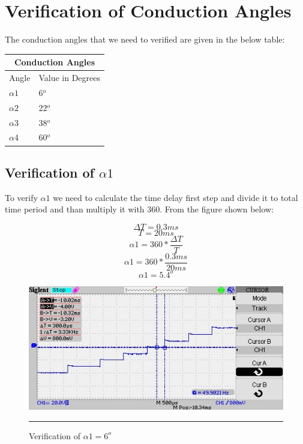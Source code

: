 \section{Verification of Conduction Angles}
The conduction angles that we need to verified are given in the below table:
\begin{center}
	\begin{tabular}{ |p{4cm}||p{4cm}|  }
		\hline
		\multicolumn{2}{|c|}{Conduction Angles} \\
		\hline
		Angle & Value in Degrees\\
		\hline
		$\alpha1$ & 6$^o$\\
		\hline
		$\alpha2$ & 22$^o$\\
		\hline
		$\alpha3$ & 38$^o$\\
		\hline
		$\alpha4$ & 60$^o$\\
		\hline
	\end{tabular}
\end{center}
\subsection{Verification of $\alpha1$ }
To verify $\alpha1$ we need to calculate the time delay first step and divide it to total time period and than multiply it with 360.
From the figure shown below:

\begin{equation}
\Delta T = 0.3ms
\end{equation}
\begin{equation}
T = 20ms
\end{equation}
\begin{equation}
\alpha1 = 360*\frac{\Delta T}{T}
\end{equation}
\begin{equation}
\alpha1 = 360*\frac{0.3ms}{20ms}
\end{equation}
\begin{equation}
\alpha1 = 5.4^o
\end{equation}

\begin{figure}[htbp]
	\centering
	\includegraphics[width = 6in]{./Figures/Photos/Hardware/18}
	\rule{35em}{1pt}
	\caption{Verification of $\alpha1 = 6^o$}
\end{figure}
\newpage
